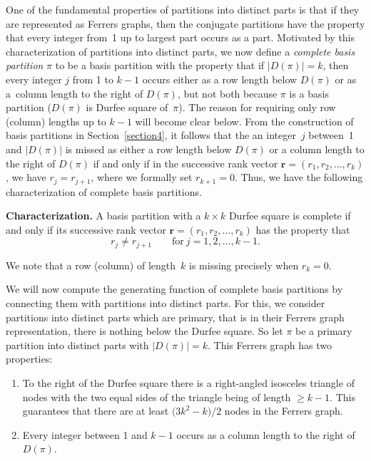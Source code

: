 \documentclass[pdftex]{sigma}
\numberwithin{equation}{section}
\theoremstyle{definition}
\begin{document}
One of the fundamental properties of partitions into distinct parts is that
if they are represented as Ferrers graphs, then the conjugate partitions have
the property that every integer from~1 up to largest part occurs as a part.
Motivated by this characterization of partitions into distinct parts, we now
define a {\it complete basis partition} $\pi$ to be a basis partition
with the property that if $|D(\pi)|=k$, then every integer $j$ from 1 to $k-1$
occurs either as a row length below $D(\pi)$ or as a~column length to the
right of $D(\pi)$, but not both because $\pi$ is a basis partition ($D(\pi)$ is Durfee square of~$\pi$). The reason
for requiring only row (column) lengths up to $k-1$ will become clear below.
From the
construction of basis partitions in Section~\ref{section4}, it follows that the an integer~$j$
between~1 and $|D(\pi)|$ is missed as either a row length below $D(\pi)$
or a column length to the right of $D(\pi)$ if and only if in the successive
rank vector $\mathbf{r}=(r_1,r_2,\dots ,r_k)$, we have $r_j=r_{j+1}$, where we
formally set $r_{k+1}=0$. Thus, we have the following characterization of
complete basis partitions.

{\bf Characterization.} A basis partition with a $k\times k$
Durfee square is complete if and only if its successive rank vector
$\mathbf{r}=(r_1,r_2,\dots ,r_k)$ has the property that
\begin{equation*}
r_j\ne r_{j+1} \qquad \text{for} \ j=1,2,\dots ,k-1.%
\end{equation*}

We note that a row (column) of length~$k$ is missing precisely when $r_k=0$.

We will now compute the generating function of complete basis partitions by
connecting them with partitions into distinct parts. For this, we consider
partitions into distinct parts which are primary, that is in their Ferrers
graph representation, there is nothing below the Durfee square. So let $\pi$
be a primary partition into distinct parts with $|D(\pi)|=k$. This Ferrers
graph has two properties:
\begin{enumerate}\itemsep=0pt
\item[(i)] To the right of the Durfee square there is a right-angled
isosceles triangle of nodes with the two equal sides of the triangle being
of length $\ge k-1$. This guarantees that there are at least $\bigl(3k^2-k\bigr)/2$ nodes
in the Ferrers graph.
\item[(ii)] Every integer between 1 and $k-1$ occurs as a column length to the right
of $D(\pi)$.
\end{enumerate}
\end{document}
